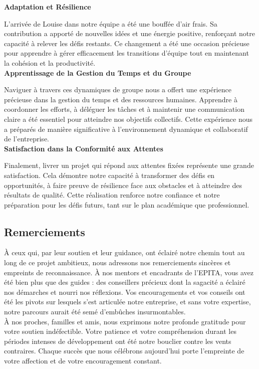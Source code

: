 \textbf{Adaptation et Résilience}

L'arrivée de Louise dans notre équipe a été une bouffée d'air frais. Sa contribution a apporté de nouvelles idées et une énergie positive, renforçant
notre capacité à relever les défis restants. Ce changement a été une occasion précieuse pour apprendre à gérer efficacement les transitions d'équipe
tout en maintenant la cohésion et la productivité.
\\

\textbf{Apprentissage de la Gestion du Temps et du Groupe}

Naviguer à travers ces dynamiques de groupe nous a offert une expérience précieuse dans la gestion du temps et des ressources humaines. Apprendre à
coordonner les efforts, à déléguer les tâches et à maintenir une communication claire a été essentiel pour atteindre nos objectifs collectifs. Cette
expérience nous a préparés de manière significative à l'environnement dynamique et collaboratif de l'entreprise.
\\

\textbf{Satisfaction dans la Conformité aux Attentes}

Finalement, livrer un projet qui répond aux attentes fixées représente une grande satisfaction. Cela démontre notre capacité à transformer des défis
en opportunités, à faire preuve de résilience face aux obstacles et à atteindre des résultats de qualité. Cette réalisation renforce notre confiance et
notre préparation pour les défis futurs, tant sur le plan académique que professionnel.

\subsection{Remerciements}

À ceux qui, par leur soutien et leur guidance, ont éclairé notre chemin tout au long de ce projet ambitieux, nous adressons nos remerciements sincères
et empreints de reconnaissance. À nos mentors et encadrants de l'EPITA, vous avez été bien plus que des guides : des conseillers précieux dont la sagacité
a éclairé nos démarches et nourri nos réflexions. Vos encouragements et vos conseils ont été les pivots sur lesquels s'est articulée notre entreprise, et sans votre
expertise, notre parcours aurait été semé d'embûches insurmontables.
\\

À nos proches, familles et amis, nous exprimons notre profonde gratitude pour votre soutien indéfectible. Votre patience et votre compréhension durant
les périodes intenses de développement ont été notre bouclier contre les vents contraires. Chaque succès que nous célébrons aujourd'hui porte l'empreinte
de votre affection et de votre encouragement constant.
\\

